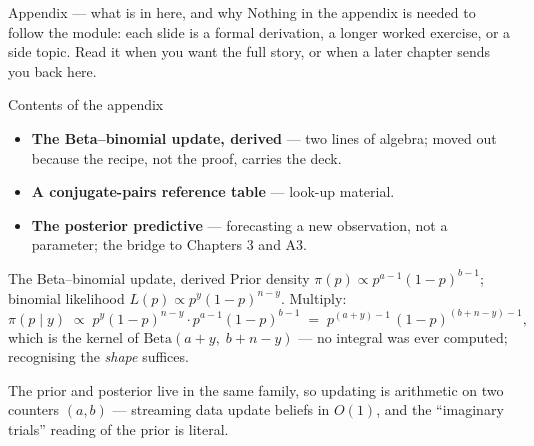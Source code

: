 \documentclass[aspectratio=169,11pt]{beamer}
\begin{document}
\begin{frame}{Appendix --- what is in here, and why}
  \footnotesize
  Nothing in the appendix is needed to follow the module: each slide is a formal
  derivation, a longer worked exercise, or a side topic. Read it when you want the
  full story, or when a later chapter sends you back here.
  \begin{block}{Contents of the appendix}
    \begin{itemize}
      \item \textbf{The Beta--binomial update, derived} --- two lines of algebra;
            moved out because the recipe, not the proof, carries the deck.
      \item \textbf{A conjugate-pairs reference table} --- look-up material.
      \item \textbf{The posterior predictive} --- forecasting a new observation,
            not a parameter; the bridge to Chapters 3 and A3.
    \end{itemize}
  \end{block}
\end{frame}

\begin{frame}{The Beta--binomial update, derived}
  \footnotesize
  Prior density $\pi(p) \propto p^{a-1}(1-p)^{b-1}$; binomial likelihood
  $L(p) \propto p^{y}(1-p)^{n-y}$. Multiply:
  \[
    \pi(p \mid y) \;\propto\; p^{y}(1-p)^{n-y} \cdot p^{a-1}(1-p)^{b-1}
    \;=\; p^{(a+y)-1}\,(1-p)^{(b+n-y)-1},
  \]
  which is the kernel of $\text{Beta}(a+y,\; b+n-y)$ --- no integral was ever
  computed; recognising the \emph{shape} suffices.
  \begin{takeaway}
    The prior and posterior live in the same family, so updating is arithmetic on
    two counters $(a, b)$ --- streaming data update beliefs in $O(1)$, and the
    ``imaginary trials'' reading of the prior is literal.
  \end{takeaway}
\end{frame}
\end{document}
